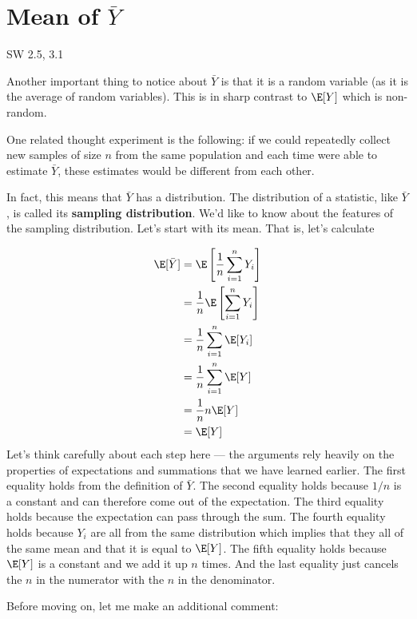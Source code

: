 \documentclass[
  letterpaper,
  DIV=11,
  numbers=noendperiod]{scrreprt}
\begin{document}
\section{\texorpdfstring{Mean of
\(\bar{Y}\)}{Mean of \textbackslash bar\{Y\}}}\label{mean-of-bary}

SW 2.5, 3.1

Another important thing to notice about \(\bar{Y}\) is that it is a
random variable (as it is the average of random variables). This is in
sharp contrast to \(\E[Y]\) which is non-random.

One related thought experiment is the following: if we could repeatedly
collect new samples of size \(n\) from the same population and each time
were able to estimate \(\bar{Y}\), these estimates would be different
from each other.

In fact, this means that \(\bar{Y}\) has a distribution. The
distribution of a statistic, like \(\bar{Y}\), is called its
\textbf{sampling distribution}. We'd like to know about the features of
the sampling distribution. Let's start with its mean. That is, let's
calculate

\[
  \begin{aligned}
    \E[\bar{Y}] &= \E\left[ \frac{1}{n} \sum_{i=1}^n Y_i \right] \\
    &= \frac{1}{n} \E\left[ \sum_{i=1}^n Y_i \right] \\
    &= \frac{1}{n} \sum_{i=1}^n \E[Y_i] \\
    &= \frac{1}{n} \sum_{i=1}^n \E[Y] \\
    &= \frac{1}{n} n \E[Y] \\
    &= \E[Y]
  \end{aligned}
\] Let's think carefully about each step here --- the arguments rely
heavily on the properties of expectations and summations that we have
learned earlier. The first equality holds from the definition of
\(\bar{Y}\). The second equality holds because \(1/n\) is a constant and
can therefore come out of the expectation. The third equality holds
because the expectation can pass through the sum. The fourth equality
holds because \(Y_i\) are all from the same distribution which implies
that they all of the same mean and that it is equal to \(\E[Y]\). The
fifth equality holds because \(\E[Y]\) is a constant and we add it up
\(n\) times. And the last equality just cancels the \(n\) in the
numerator with the \(n\) in the denominator.

Before moving on, let me make an additional comment:
\end{document}
